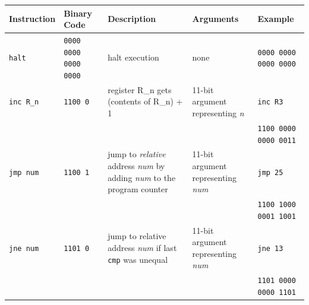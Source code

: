 \documentclass{report}
\begin{document}
\pagebreak
\begin{table}[h]
	\centering
	\small

	\begin{tabularx}{\textwidth}{@{}l l X X X@{}}
		\toprule
		\textbf{Instruction} & \textbf{Binary Code}                                                                   & \textbf{Description} & \textbf{Arguments} & \textbf{Example} \\
		\midrule
		\texttt{halt}
		                     & \texttt{0000 0000 0000 0000}
		                     & halt execution
		                     & none
		                     & \texttt{0000 0000 0000 0000}
		\\

		\texttt{inc R\_n}
		                     & \texttt{1100 0}
		                     & register R\_n gets (contents of R\_n) + 1
		                     & 11-bit argument representing \emph{n}
		                     & \texttt{inc R3}                                                                                                                                       \\
		                     &
		                     &
		                     &
		                     & \texttt{1100 0000 0000 0011}
		\\

		\texttt{jmp num}
		                     & \texttt{1100 1}
		                     & jump to \emph{relative} address \emph{num} by adding \emph{num} to the program counter
		                     & 11-bit argument representing \emph{num}
		                     & \texttt{jmp 25}                                                                                                                                       \\
		                     &
		                     &
		                     &
		                     & \texttt{1100 1000 0001 1001}
		\\

		\texttt{jne num}
		                     & \texttt{1101 0}
		                     & jump to relative address \emph{num} if last \texttt{cmp} was unequal
		                     & 11-bit argument representing \emph{num}
		                     & \texttt{jne 13}                                                                                                                                       \\
		                     &
		                     &
		                     &
		                     & \texttt{1101 0000 0000 1101}
		\\


\end{tabularx}
\end{table}
\end{document}

